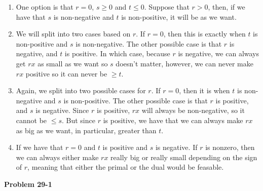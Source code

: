 \documentclass{article}
\begin{document}
\begin{enumerate}[1.]
\item
One option is that $r= 0$, $s\ge 0$ and $t\le 0$. Suppose that $r>0$, then, if we have that $s$ is non-negative and $t$ is non-positive, it will be as we want. 
\item
We will split into two cases based on $r$. If $r=0$, then this is exactly when $t$ is non-positive and $s$ is non-negative.
The other possible case is that $r$ is negative, and $t$ is positive. In which case, because $r$ is negative, we can always get $rx$ as small as we want so $s$ doesn't matter, however, we can never make $rx$ positive so it can never be $\ge t$.
\item
Again, we split into two possible cases for $r$. If $r=0$, then it is when $t$ is non-negative and $s$ is non-positive. The other possible case is that $r$ is positive, and $s$ is negative. Since $r$ is positive, $rx$ will always be non-negative, so it cannot be $\le s$. But since $r$ is positive, we have that we can always make $rx$ as big as we want, in particular, greater than $t$.
\item
If we have that $r=0$ and $t$ is positive and $s$ is negative. If $r$ is nonzero, then we can always either make $rx$ really big or really small depending on the sign of $r$, meaning that either the primal or the dual would be feasable.

\end{enumerate}



\noindent\textbf{Problem 29-1}\\
\end{document}
